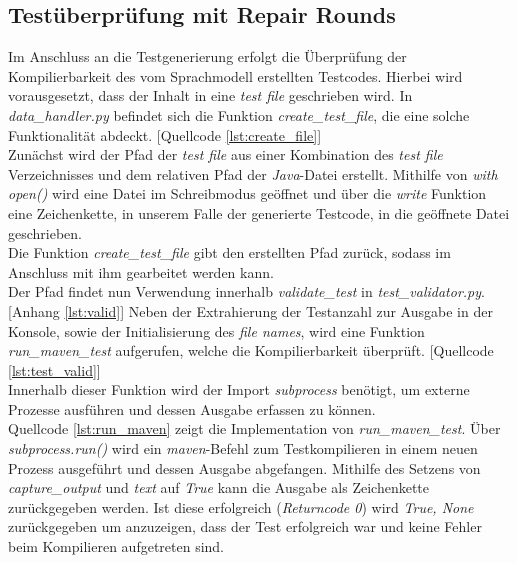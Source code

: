 \subsection{Testüberprüfung mit Repair Rounds}
Im Anschluss an die Testgenerierung erfolgt die Überprüfung der Kompilierbarkeit des vom Sprachmodell erstellten Testcodes. Hierbei wird vorausgesetzt, dass der Inhalt in eine \textit{test file} geschrieben wird. In \textit{data\_handler.py} befindet sich die Funktion \textit{create\_test\_file}, die eine solche Funktionalität abdeckt. [Quellcode \ref{lst:create_file}]\\
Zunächst wird der Pfad der \textit{test file} aus einer Kombination des \textit{test file} Verzeichnisses und dem relativen Pfad der \textit{Java}-Datei erstellt. Mithilfe von \textit{with open()} wird eine Datei im Schreibmodus geöffnet und über die \textit{write} Funktion eine Zeichenkette, in unserem Falle der generierte Testcode, in die geöffnete Datei geschrieben. \\Die Funktion \textit{create\_test\_file} gibt den erstellten Pfad zurück, sodass im Anschluss mit ihm gearbeitet werden kann.\\[0.4cm]
\vspace{-.3cm}
Der Pfad findet nun Verwendung innerhalb \textit{validate\_test} in \textit{test\_validator.py}. [Anhang \ref{lst:valid}] Neben der Extrahierung der Testanzahl zur Ausgabe in der Konsole, sowie der Initialisierung des \textit{file names}, wird eine Funktion \textit{run\_maven\_test} aufgerufen, welche die Kompilierbarkeit überprüft. [Quellcode \ref{lst:test_valid}] \\Innerhalb dieser Funktion wird der Import \textit{subprocess} benötigt, um externe Prozesse ausführen und dessen Ausgabe erfassen zu können. \\
\vspace{-.3cm}
Quellcode \ref{lst:run_maven} zeigt die Implementation von \textit{run\_maven\_test}. Über \textit{subprocess.run()} wird ein \textit{maven}-Befehl zum Testkompilieren in einem neuen Prozess ausgeführt und dessen Ausgabe abgefangen.
Mithilfe des Setzens von \textit{capture\_output} und \textit{text} auf \textit{True} kann die Ausgabe als Zeichenkette zurückgegeben werden. Ist diese erfolgreich (\textit{Returncode 0}) wird \textit{True, None} zurückgegeben um anzuzeigen, dass der Test erfolgreich war und keine Fehler beim Kompilieren aufgetreten sind.\\
